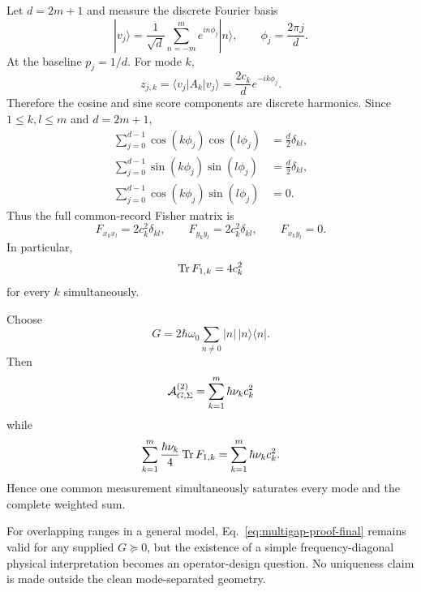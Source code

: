 Let $d=2m+1$ and measure the discrete Fourier basis
\begin{equation}
|v_j\rangle
=\frac1{\sqrt d}\sum_{n=-m}^{m}e^{in\phi_j}|n\rangle,
\qquad
\phi_j=\frac{2\pi j}{d}.
\end{equation}
At the baseline $p_j=1/d$. For mode $k$,
\begin{equation}
z_{j,k}
=\langle v_j|A_k|v_j\rangle
=\frac{2c_k}{d}e^{-ik\phi_j}.
\end{equation}
Therefore the cosine and sine score components are discrete harmonics. Since $1\le k,l\le m$ and $d=2m+1$,
\begin{align}
\sum_{j=0}^{d-1}\cos(k\phi_j)\cos(l\phi_j)
&=\frac d2\delta_{kl},\\
\sum_{j=0}^{d-1}\sin(k\phi_j)\sin(l\phi_j)
&=\frac d2\delta_{kl},\\
\sum_{j=0}^{d-1}\cos(k\phi_j)\sin(l\phi_j)
&=0.
\end{align}
Thus the full common-record Fisher matrix is
\begin{equation}
F_{x_kx_l}=2c_k^2\delta_{kl},
\qquad
F_{y_ky_l}=2c_k^2\delta_{kl},
\qquad
F_{x_ky_l}=0.
\end{equation}
In particular,
\begin{equation}
\operatorname{Tr} F_{1,k}=4c_k^2
\end{equation}
for every $k$ simultaneously.

Choose
\begin{equation}
G=2\hbar\omega_0
\sum_{n\ne0}|n|\,|n\rangle\langle n|.
\end{equation}
Then
\begin{equation}
\mathcal A_{G,\Sigma}^{(2)}
=\sum_{k=1}^m\hbar\nu_k c_k^2
\end{equation}
while
\begin{equation}
\sum_{k=1}^m
\frac{\hbar\nu_k}{4}\operatorname{Tr} F_{1,k}
=\sum_{k=1}^m\hbar\nu_k c_k^2.
\end{equation}
Hence one common measurement simultaneously saturates every mode and the complete weighted sum.

For overlapping ranges in a general model, Eq.~\eqref{eq:multigap-proof-final} remains valid for any supplied $G\succeq0$, but the existence of a simple frequency-diagonal physical interpretation becomes an operator-design question. No uniqueness claim is made outside the clean mode-separated geometry.
